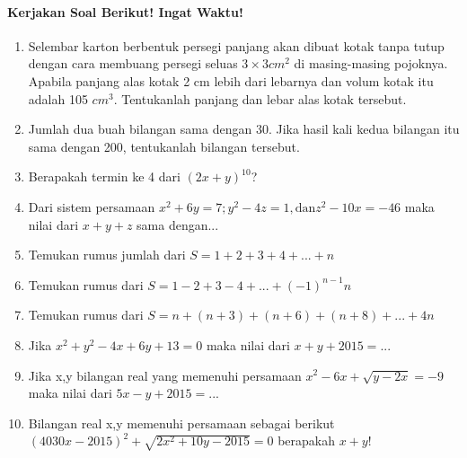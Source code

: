 \documentclass[12pt,a4paper,draft,final,oneside,twoside,openright,openany]{article}
\begin{document}
		\paragraph{Kerjakan Soal Berikut! Ingat Waktu!}
		\begin{enumerate}
		
		\item  Selembar karton berbentuk persegi panjang akan dibuat kotak tanpa tutup dengan cara membuang persegi seluas $3\times 3 cm^2$ di masing-masing pojoknya. Apabila panjang alas kotak 2 cm lebih dari lebarnya dan volum kotak itu adalah 105 $cm^3$. Tentukanlah panjang dan lebar alas kotak tersebut.
		\item Jumlah dua buah bilangan sama dengan 30. Jika hasil kali kedua bilangan itu sama dengan 200, tentukanlah bilangan tersebut.
		\item Berapakah termin ke 4 dari $(2x+y)^{10}$?
		\item Dari sistem persamaan $x^2+6y=7;y^2-4z=1, \text{dan} z^2-10x=-46$ maka nilai dari $x+y+z$ sama dengan...
		\item Temukan rumus jumlah dari $S=1+2+3+4+...+n$
		\item Temukan rumus dari $S=1-2+3-4+...+(-1)^{n-1}n$
		\item Temukan rumus dari $S=n+(n+3)+(n+6)+(n+8)+...+4n$
		\item Jika $x^2+y^2-4x+6y+13=0$ maka nilai dari $x+y+2015=...$
		\item Jika x,y bilangan real yang memenuhi persamaan $x^2-6x+\sqrt{y-2x}=-9$ maka nilai dari $5x-y+2015=...$
		\item Bilangan real x,y memenuhi persamaan sebagai berikut $(4030x-2015)^2+\sqrt{2x^2+10y-2015}=0$ berapakah $x+y$!
		\end{enumerate}
\end{document}
